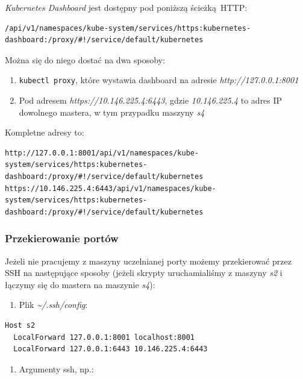 \documentclass[a4paper,12pt,twoside,openany]{report}
\providecommand{\tightlist}{%
  \setlength{\itemsep}{0pt}\setlength{\parskip}{0pt}}
\newcommand{\passthrough}[1]{#1}
\begin{document}
\emph{Kubernetes Dashboard} jest dostępny pod poniższą ścieżką~HTTP:

\begin{lstlisting}
/api/v1/namespaces/kube-system/services/https:kubernetes-dashboard:/proxy/#!/service/default/kubernetes
\end{lstlisting}

Można się do niego dostać na dwa sposoby:

\begin{enumerate}
\def\labelenumi{\arabic{enumi}.}
\tightlist
\item
  \passthrough{\lstinline!kubectl proxy!}, które wystawia dashboard na
  adresie \emph{http://127.0.0.1:8001}
\item
  Pod adresem \emph{https://10.146.225.4:6443}, gdzie
  \emph{10.146.225.4} to adres IP dowolnego mastera, w tym przypadku
  maszyny \emph{s4}
\end{enumerate}

Kompletne adresy to:

\begin{lstlisting}
http://127.0.0.1:8001/api/v1/namespaces/kube-system/services/https:kubernetes-dashboard:/proxy/#!/service/default/kubernetes
https://10.146.225.4:6443/api/v1/namespaces/kube-system/services/https:kubernetes-dashboard:/proxy/#!/service/default/kubernetes
\end{lstlisting}

\hypertarget{przekierowanie-portuxf3w}{%
\subsubsection{Przekierowanie portów}\label{przekierowanie-portuxf3w}}

Jeżeli nie pracujemy z maszyny uczelnianej porty możemy przekierować
przez SSH na następujące sposoby (jeżeli skrypty uruchamialiśmy z
maszyny \emph{s2} i łączymy się do mastera na maszynie \emph{s4}):

\begin{enumerate}
\def\labelenumi{\arabic{enumi}.}
\tightlist
\item
  Plik \emph{\textasciitilde{}/.ssh/config}:
\end{enumerate}

\begin{lstlisting}
Host s2
  LocalForward 127.0.0.1:8001 localhost:8001
  LocalForward 127.0.0.1:6443 10.146.225.4:6443
\end{lstlisting}

\begin{enumerate}
\def\labelenumi{\arabic{enumi}.}
\setcounter{enumi}{1}
\tightlist
\item
  Argumenty ssh, np.:
\end{enumerate}
\end{document}
